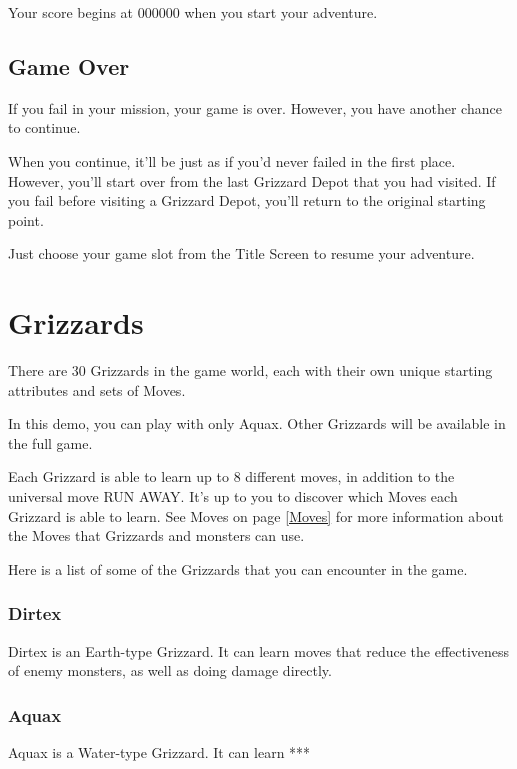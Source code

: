\documentclass[12pt,openright,book]{memoir}
\begin{document}
\begin{description}
Your score begins at 000000 when you start your adventure.

\section{Game Over}

If  you fail  in your  mission,  your game  is over.  However, you  have
another chance to continue.

When you continue, it'll  be just as if you'd never  failed in the first
place. However, you'll start over from  the last Grizzard Depot that you
had visited. If you fail before visiting a Grizzard Depot, you'll return
to the original starting point.

Just  choose   your  game   slot  from  the   Title  Screen   to  resume
your adventure.

\chapter{Grizzards}

There are  30 Grizzards in  the game world,  each with their  own unique
starting attributes and sets of Moves.

\ifdefined\DEMO

In this  demo, you  can play  with only Aquax.  Other Grizzards  will be
available in the full game.

\fi

Each Grizzard is able  to learn up to 8 different  moves, in addition to
the universal move RUN AWAY. It's up to you to discover which Moves each
Grizzard  is able  to  learn. See  Moves on  page  \ref{Moves} for  more
information about the Moves that Grizzards and monsters can use.

Here  is a  list of  some of  the Grizzards  that you  can encounter  in
the game.

\subsection{Dirtex}

Dirtex is  an Earth-type Grizzard.  It can  learn moves that  reduce the
effectiveness of enemy monsters, as well as doing damage directly.

\subsection{Aquax}

Aquax is a Water-type Grizzard. It can learn ***


\end{description}
\end{document}
